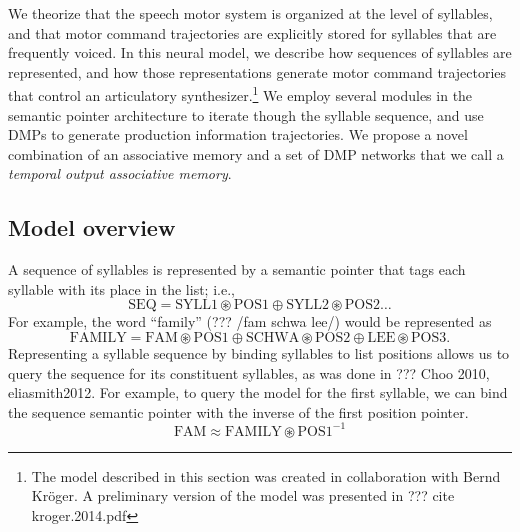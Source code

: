 We theorize that the speech motor system
is organized at the level of syllables,
and that motor command trajectories are explicitly stored
for syllables that are frequently voiced.
In this neural model,
we describe how sequences of syllables are represented,
and how those representations
generate motor command trajectories
that control an articulatory synthesizer.\footnote{
  The model described in this section was created
  in collaboration with Bernd Kr\"{o}ger.
  A preliminary version of the model was presented
  in ??? cite kroger.2014.pdf}
We employ several modules in the semantic pointer architecture
to iterate though the syllable sequence,
and use DMPs to generate production information trajectories.
We propose a novel combination of an associative memory
and a set of DMP networks
that we call a \textit{temporal output associative memory}.

\subsection{Model overview}

A sequence of syllables is represented
by a semantic pointer
that tags each syllable with its place
in the list; i.e.,
\begin{equation}
  \text{SEQ} = \text{SYLL1} \circledast \text{POS1} \oplus
    \text{SYLL2} \circledast \text{POS2} \ldots
\end{equation}
For example, the word ``family'' (??? /fam schwa lee/)
would be represented as
\begin{equation}
  \text{FAMILY} = \text{FAM} \circledast \text{POS1} \oplus
    \text{SCHWA} \circledast \text{POS2} \oplus
    \text{LEE} \circledast \text{POS3}.
\end{equation}
Representing a syllable sequence
by binding syllables to list positions
allows us to query the sequence
for its constituent syllables,
as was done in ??? Choo 2010, eliasmith2012.
For example, to query the model
for the first syllable,
we can bind the sequence semantic pointer
with the inverse of the first position pointer.
\begin{equation}
  \text{FAM} \approx \text{FAMILY} \circledast \text{POS1}^{-1}
\end{equation}

